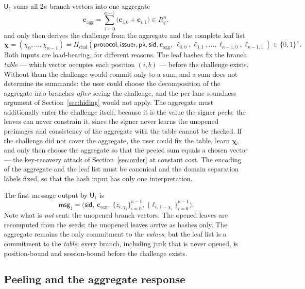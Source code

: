 \documentclass[11pt]{article}
\newcommand{\R}{R_q}
\newcommand{\U}{\mathsf{U}}
\begin{document}
$\U_1$ sums all $2\kappa$ branch vectors into one aggregate
\[
 \mathbf c_{\mathrm{agg}}=\sum_{i=0}^{\kappa-1}
 \bigl(\mathbf c_{i,0}+\mathbf c_{i,1}\bigr)\in\R^{n},
\]
and only then derives the challenge from the aggregate and the complete leaf
list
\[
 \boldsymbol\chi=(\chi_0,\ldots,\chi_{\kappa-1})
 =H_{\mathrm{chal}}(\mathsf{protocol},\mathsf{issuer},\mathsf{pk},
   \mathsf{sid},\mathbf c_{\mathrm{agg}},\
   \ell_{0,0},\ell_{0,1},\ldots,\ell_{\kappa-1,0},\ell_{\kappa-1,1})
   \in\{0,1\}^{\kappa}.
\]
Both inputs are load-bearing, for different reasons.  The leaf hashes fix the
branch \emph{table} --- which vector occupies each position $(i,b)$ ---
before the challenge exists.  Without them the challenge would commit only to
a sum, and a sum does not determine its summands: the user could choose the
decomposition of the aggregate into branches \emph{after} seeing the
challenge, and the per-lane soundness argument of Section~\ref{sec:hiding}
would not apply.  The aggregate must additionally enter the challenge itself,
because it is the value the signer peels: the leaves can never constrain it,
since the signer never learns the unopened preimages and consistency of the
aggregate with the table cannot be checked.  If the challenge did not cover
the aggregate, the user could fix the table, learn $\boldsymbol\chi$, and
only then choose the aggregate so that the peeled sum equals a chosen vector
--- the key-recovery attack of Section~\ref{sec:order} at constant cost.  The
encoding of the aggregate and the leaf list must be canonical and the domain
separation labels fixed, so that the hash input has only one interpretation.

The first message output by $\U_1$ is
\[
 \mathsf{msg}_{1}=
 \bigl(\mathsf{sid},\ \mathbf c_{\mathrm{agg}},\
 \{z_{i,\chi_i}\}_{i=0}^{\kappa-1},\
 \{\ell_{i,\,1-\chi_i}\}_{i=0}^{\kappa-1}\bigr).
\]
Note what is \emph{not} sent: the unopened branch vectors.  The opened leaves
are recomputed from the seeds; the unopened leaves arrive as hashes only.
The aggregate remains the only commitment to the \emph{values}, but the leaf
list is a commitment to the \emph{table}: every branch, including junk that
is never opened, is position-bound and session-bound before the challenge
exists.

\subsection{Peeling and the aggregate response}
\label{sec:peeling}
\end{document}
